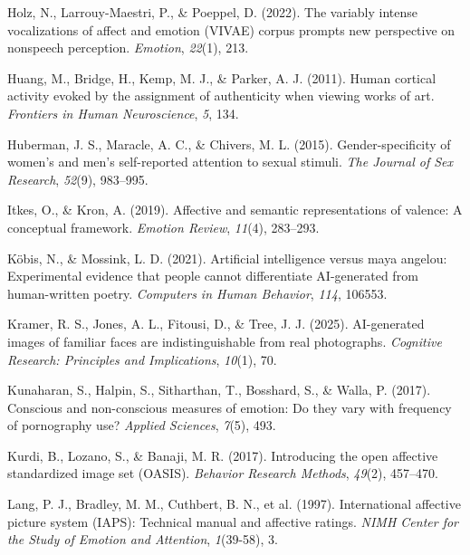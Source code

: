 \documentclass[
  jou,
  floatsintext,
  longtable,
  nolmodern,
  notxfonts,
  notimes,
  colorlinks=true,linkcolor=blue,citecolor=blue,urlcolor=blue]{apa7}
\newlength{\cslhangindent}
\newenvironment{CSLReferences}[2] %
 {\begin{list}{}{%
  \setlength{\itemindent}{0pt}
  \setlength{\leftmargin}{0pt}
  \setlength{\parsep}{0pt}
  \ifodd #1
   \setlength{\leftmargin}{\cslhangindent}
   \setlength{\itemindent}{-1\cslhangindent}
  \fi
  \setlength{\itemsep}{#2\baselineskip}}}
 {\end{list}}
\begin{document}
\begin{CSLReferences}{1}{0}
Holz, N., Larrouy-Maestri, P., \& Poeppel, D. (2022). The variably
intense vocalizations of affect and emotion (VIVAE) corpus prompts new
perspective on nonspeech perception. \emph{Emotion}, \emph{22}(1), 213.

Huang, M., Bridge, H., Kemp, M. J., \& Parker, A. J. (2011). Human
cortical activity evoked by the assignment of authenticity when viewing
works of art. \emph{Frontiers in Human Neuroscience}, \emph{5}, 134.

Huberman, J. S., Maracle, A. C., \& Chivers, M. L. (2015).
Gender-specificity of women's and men's self-reported attention to
sexual stimuli. \emph{The Journal of Sex Research}, \emph{52}(9),
983--995.

Itkes, O., \& Kron, A. (2019). Affective and semantic representations of
valence: A conceptual framework. \emph{Emotion Review}, \emph{11}(4),
283--293.

Köbis, N., \& Mossink, L. D. (2021). Artificial intelligence versus maya
angelou: Experimental evidence that people cannot differentiate
AI-generated from human-written poetry. \emph{Computers in Human
Behavior}, \emph{114}, 106553.

Kramer, R. S., Jones, A. L., Fitousi, D., \& Tree, J. J. (2025).
AI-generated images of familiar faces are indistinguishable from real
photographs. \emph{Cognitive Research: Principles and Implications},
\emph{10}(1), 70.

Kunaharan, S., Halpin, S., Sitharthan, T., Bosshard, S., \& Walla, P.
(2017). Conscious and non-conscious measures of emotion: Do they vary
with frequency of pornography use? \emph{Applied Sciences}, \emph{7}(5),
493.

Kurdi, B., Lozano, S., \& Banaji, M. R. (2017). Introducing the open
affective standardized image set (OASIS). \emph{Behavior Research
Methods}, \emph{49}(2), 457--470.

Lang, P. J., Bradley, M. M., Cuthbert, B. N., et al. (1997).
International affective picture system (IAPS): Technical manual and
affective ratings. \emph{NIMH Center for the Study of Emotion and
Attention}, \emph{1}(39-58), 3.


\end{CSLReferences}
\end{document}
